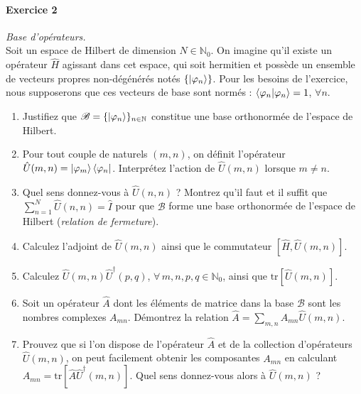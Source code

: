 \paragraph{Exercice 2} \textit{Base d'opérateurs.} \\
Soit un espace de Hilbert de dimension $N\in\mathbb N_0$. On imagine qu'il existe un opérateur $\hat H$ agissant dans cet espace, qui soit hermitien et possède un ensemble de vecteurs propres non-dégénérés notés $\lbrace\ket{\varphi_n}\rbrace$. Pour les besoins de l'exercice, nous supposerons que ces vecteurs de base sont normés : $\braket{\varphi_n}{\varphi_n} = 1$, $\forall n$. 
	\begin{enumerate}
	\item Justifiez que $\mathscr B = \lbrace\ket{\varphi_n}\rbrace_{n\in\mathbb{N}}$ constitue une base orthonormée de l'espace de Hilbert. 
	\item Pour tout couple de naturels $(m,n)$, on définit l'opérateur $\hat U(m,n) = \ket{\varphi_m}\bra{\varphi_n}$. Interprétez l'action de $\hat U(m,n)$ lorsque $m\neq n$.
	\item Quel sens donnez-vous à $\hat U(n,n)$ ? Montrez qu'il faut et il suffit que $\sum_{n=1}^N \hat U(n,n) = \hat I$ pour que $\mathscr B$ forme une base orthonormée de l'espace de Hilbert (\textit{relation de fermeture}).
	\item Calculez l'adjoint de $\hat U(m,n)$ ainsi que le commutateur $[\hat H,\hat U(m,n)]$.
	\item Calculez $\hat U(m,n) \hat U^\dagger (p,q)$, $\forall\, m,n,p,q \in \mathbb{N}_0$, ainsi que $\text{tr} [\hat U(m,n)]$. 
	\item Soit un opérateur $\hat A$ dont les éléments de matrice dans la base $\mathscr B$ sont les nombres complexes $A_{mn}$. Démontrez la relation $\hat A = \sum_{m,n} A_{mn} \hat U(m,n)$.
	\item Prouvez que si l'on dispose de l'opérateur $\hat A$ et de la collection d'opérateurs $\hat U(m,n)$, on peut facilement obtenir les composantes $A_{mn}$ en calculant $A_{mn} = \text{tr} [\hat A \hat U^\dagger (m,n)]$. Quel sens donnez-vous alors à $\hat U(m,n)$ ?
	\end{enumerate}
	
\newpage
